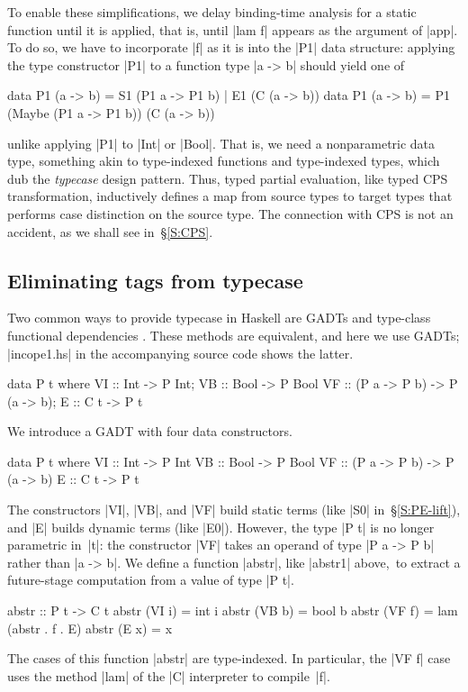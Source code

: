 To enable these simplifications, we delay binding-time analysis
for a static function until it is applied, that is, until |lam f|
appears as the argument of |app|.  To do so, we have to incorporate |f|
as it is into the |P1| data structure: applying the type constructor
|P1| to a function type |a -> b| should yield one of
\ifshort\vspace*{-0.7em}\fi
\begin{code}
data P1 (a -> b) = S1 (P1 a -> P1 b) | E1 (C (a -> b))
data P1 (a -> b) = P1 (Maybe (P1 a -> P1 b)) (C (a -> b))
\end{code}
\ifshort\vspace*{-0.7em}\fi
unlike applying |P1| to |Int| or |Bool|.
That is, we need a nonparametric data type, something akin to
type-indexed functions and type-indexed types, which
\citet{oliveira-typecase} dub the \emph{typecase} design pattern.
Thus, typed partial evaluation, like typed CPS transformation,
inductively defines a map from source types to target types that
performs case distinction on the source type.
\ifshort\else The connection with CPS
is not an accident, as we shall see in~\S\ref{S:CPS}.\fi

\subsection{Eliminating tags from typecase}
\label{S:PE-GADT}

Two common ways to provide typecase in Haskell are
GADTs and type-class functional dependencies
\citep{oliveira-typecase}.  These
methods are equivalent, and here we use GADTs; |incope1.hs|
in the accompanying source code shows the latter.
\ifshort
\vspace*{-0.7em}
\begin{code3}
data P t where
  VI :: Int  -> P Int;                VB :: Bool -> P Bool
  VF :: (P a -> P b) -> P (a -> b);   E  :: C t -> P t
\end{code3}
\vspace*{-0.7em}
\else
We introduce a GADT with four data constructors.
\begin{code}
data P t where
  VI :: Int  -> P Int
  VB :: Bool -> P Bool
  VF :: (P a -> P b) -> P (a -> b)
  E  :: C t -> P t
\end{code}
\fi
The constructors |VI|, |VB|, and |VF| build static terms (like |S0|
in~\S\ref{S:PE-lift}), and |E| builds dynamic terms (like |E0|).  \ifshort\else However,
the type |P t| is no longer parametric in~|t|: the constructor |VF| takes an
operand of type |P a -> P b| rather than |a -> b|.  \fi We define a function
\ifshort |abstr|, \fi like |abstr1| above\ifshort,\fi\
to extract a future-stage computation from a value of type |P t|.
\ifshort\else
\begin{code}
abstr :: P t -> C t
abstr (VI i) = int i
abstr (VB b) = bool b
abstr (VF f) = lam (abstr . f . E)
abstr (E x)  = x
\end{code}
The cases of this function |abstr| are type-indexed.  In particular, the |VF f|
case uses the method |lam| of the |C| interpreter to compile~|f|.

